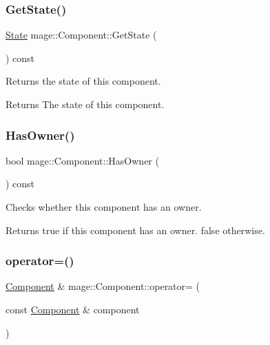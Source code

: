 \subsubsection{\texorpdfstring{Get\+State()}{GetState()}}
{\footnotesize\ttfamily \mbox{\hyperlink{namespacemage_ae47d13d8477ee94893b9a3947d28eebc}{State}} mage\+::\+Component\+::\+Get\+State (\begin{DoxyParamCaption}{ }\end{DoxyParamCaption}) const\hspace{0.3cm}{\ttfamily [noexcept]}}

Returns the state of this component.

\begin{DoxyReturn}{Returns}
The state of this component. 
\end{DoxyReturn}
\mbox{\label{classmage_1_1_component_a8e62e223bdacc3eebddc43f8ebc8c4d9}} 
\subsubsection{\texorpdfstring{Has\+Owner()}{HasOwner()}}
{\footnotesize\ttfamily bool mage\+::\+Component\+::\+Has\+Owner (\begin{DoxyParamCaption}{ }\end{DoxyParamCaption}) const\hspace{0.3cm}{\ttfamily [noexcept]}}

Checks whether this component has an owner.

\begin{DoxyReturn}{Returns}
{\ttfamily true} if this component has an owner. {\ttfamily false} otherwise. 
\end{DoxyReturn}
\mbox{\label{classmage_1_1_component_a36f7fbb5f82fc7979d4e7d08389815ae}} 
\subsubsection{\texorpdfstring{operator=()}{operator=()}\hspace{0.1cm}{\footnotesize\ttfamily [1/2]}}
{\footnotesize\ttfamily \mbox{\hyperlink{classmage_1_1_component}{Component}} \& mage\+::\+Component\+::operator= (\begin{DoxyParamCaption}\item[{const \mbox{\hyperlink{classmage_1_1_component}{Component}} \&}]{component }\end{DoxyParamCaption})\hspace{0.3cm}{\ttfamily [noexcept]}}

